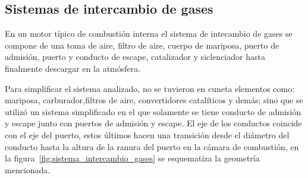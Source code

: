 %
%
%
%
%


\subsection{Sistemas de intercambio de gases}
%
En un motor típico de combustión interna el sistema de intecambio de gases se
compone de una toma de aire, filtro de aire, cuerpo de mariposa, puerto de
admisión, puerto y conducto de escape, catalizador y siclenciador hasta
finalmente descargar en la atmósfera.

Para simplificar el sistema analizado, no se tuvieron en cuneta elementos como:
mariposa, carburador,filtros de aire, convertidores catalíticos y demás;  sino
que se utilizó un sistema simplificado en el que solamente se tiene conducto de
admisión y escape junto con puertos de admisión y escape.
%
El eje de los conductos coincide con el eje del puerto, estos últimos hacen una
transición desde el diámetro del conducto hasta la altura de la ranura del
puerto en la cámara de combustión, en la
figura~\ref{fig:sistema_intercambio_gases} se esquematiza la geometría
mencionada.

